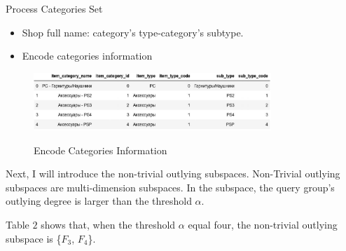 \documentclass[
 size=12pt,
 paper=smartboard,  %
 mode=present, 		%
 display=slides, 	%
 style=tuliplab,  	%
 pauseslide,
 fleqn,leqno]{powerdot}
\begin{document}
\begin{slide}{Process Categories Set}
\begin{itemize}
\item
\smallskip
Shop full name: category’s type-category’s subtype.
\item
\smallskip
Encode categories information
\end{itemize}

\vspace{0.75cm}
\begin{figure}[htbp]
  \centering
  \includegraphics[width=0.8\textwidth,height=0.3\textwidth]{figures/Figure4.eps}\\
  \caption{Encode Categories Information}
\end{figure}



\begin{note}
Next,
I will introduce the non-trivial outlying subspaces.
Non-Trivial outlying subspaces are multi-dimension subspaces.
In the subspace,
the query group's outlying degree is larger than the threshold $\alpha$.

Table $2$ shows that,
when the threshold $\alpha$ equal four,
the non-trivial outlying subspace is \{$F_3$, $F_4$\}.
\end{note}

\end{slide}
\end{document}
